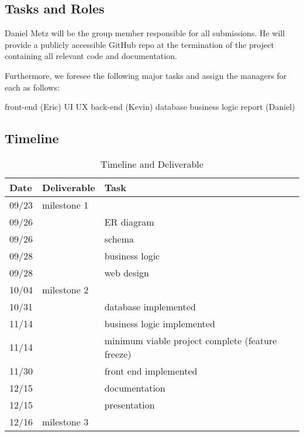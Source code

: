 \subsection{Tasks and Roles}
Daniel Metz will be the group member responsible for all submissions. He will
provide a publicly accessible GitHub repo at the termination of the project
containing all relevant code and documentation.

Furthermore, we foresee the following major tasks and assign the
managers for each as follows:

\begin{outline}
\1 front-end (Eric)
    \2 UI
    \2 UX
\1 back-end (Kevin)
    \2 database
    \2 business logic
\1 report (Daniel)
\end{outline}

\subsection{Timeline}

\begin{table}[h] \centering
\begin{tabular}{lll} \toprule
Date & Deliverable & Task \\ \midrule
09/23 & milestone 1  \\ \midrule
09/26 & ~ & ER diagram \\
09/26 & ~ & schema \\
09/28 & ~ & business logic \\
09/28 & ~ & web design \\ \midrule
10/04 & milestone 2  \\ \midrule
10/31 & ~ & database implemented \\
11/14 & ~ & business logic implemented \\
11/14 & ~ & minimum viable project complete (feature freeze) \\
11/30 & ~ & front end implemented \\
12/15 & ~ & documentation \\
12/15 & ~ & presentation \\ \midrule
12/16 & milestone 3 \\
\bottomrule
\end{tabular}
\caption{Timeline and Deliverable}
\end{table}